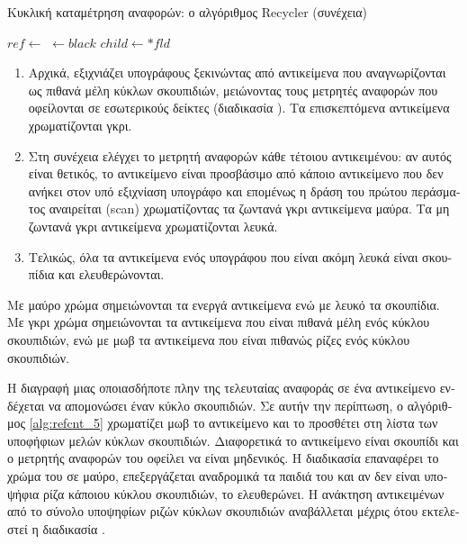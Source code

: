 \begin{greek}
\begin{algorithm}
  \ContinuedFloat
  \caption{Κυκλική καταμέτρηση αναφορών: ο αλγόριθμος Recycler (συνέχεια)}
  \begin{algorithmic}
        \State $ref \gets$ 
        \State {}
      \EndWhile
    \EndProcedure
    \Statex
        \State {} $\gets black$ 
          \State $child \gets *fld$
            \State {}
          \EndIf
        \EndFor
        \State {}
     \EndIf
   \EndProcedure
  \end{algorithmic}
\end{algorithm}

\begin{enumerate}
  \item Αρχικά, εξιχνιάζει υπογράφους ξεκινώντας από αντικείμενα
    που αναγνωρίζονται ως πιθανά μέλη κύκλων σκουπιδιών,
    μειώνοντας τους μετρητές αναφορών που οφείλονται σε
    εσωτερικούς δείκτες (διαδικασία ).
    Τα επισκεπτόμενα αντικείμενα χρωματίζονται γκρι.
  \item Στη συνέχεια ελέγχει το μετρητή αναφορών κάθε τέτοιου
    αντικειμένου: αν αυτός είναι θετικός, το αντικείμενο είναι
    προσβάσιμο από κάποιο αντικείμενο που δεν ανήκει στον υπό
    εξιχνίαση υπογράφο και επομένως η δράση του πρώτου περάσματος
    αναιρείται (scan) χρωματίζοντας τα ζωντανά γκρι αντικείμενα
    μαύρα. Τα μη ζωντανά γκρι αντικείμενα χρωματίζονται λευκά.
  \item Τελικώς, όλα τα αντικείμενα ενός υπογράφου που είναι
    ακόμη λευκά είναι σκουπίδια και ελευθερώνονται.
\end{enumerate}

Με μαύρο χρώμα σημειώνονται τα ενεργά αντικείμενα ενώ με
λευκό τα σκουπίδια. Με γκρι χρώμα σημειώνονται τα αντικείμενα
που είναι πιθανά μέλη ενός κύκλου σκουπιδιών, ενώ με μωβ τα
αντικείμενα που είναι πιθανώς ρίζες ενός κύκλου σκουπιδιών.

Η διαγραφή μιας οποιασδήποτε πλην της τελευταίας αναφοράς σε
ένα αντικείμενο ενδέχεται να απομονώσει έναν κύκλο σκουπιδιών.
Σε αυτήν την περίπτωση, ο αλγόριθμος \ref{alg:refcnt_5}
χρωματίζει μωβ το αντικείμενο και το προσθέτει στη λίστα των
υποφήφιων μελών κύκλων σκουπιδιών. Διαφορετικά το αντικείμενο
είναι σκουπίδι και ο μετρητής αναφορών του οφείλει να είναι
μηδενικός. Η διαδικασία  επαναφέρει το χρώμα
του σε μαύρο, επεξεργάζεται αναδρομικά τα παιδιά του και αν
δεν είναι υποψήφια ρίζα κάποιου κύκλου σκουπιδιών, το
ελευθερώνει. Η ανάκτηση αντικειμένων από το σύνολο υποψηφίων
ριζών κύκλων σκουπιδιών αναβάλλεται μέχρις ότου εκτελεστεί
η διαδικασία . 


\end{greek}
